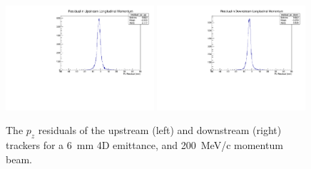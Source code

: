    \begin{figure}[p]
    \begin{center}
      \includegraphics[width=0.49\textwidth, angle=0]{08-Performance/residual_pz_up.pdf}
      \includegraphics[width=0.49\textwidth, angle=0]{08-Performance/residual_pz_down.pdf}
      \caption{\label{fig:PzResidKalman} The $p_z$ residuals of the upstream (left) and downstream (right) trackers for a 6~mm 4D emittance, and 200~MeV/c momentum beam.}
    \end{center}
  \end{figure}